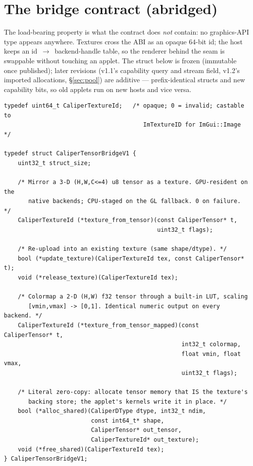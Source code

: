 \documentclass[11pt]{article}
\begin{document}
\appendix
\section{The bridge contract (abridged)}

The load-bearing property is what the contract does \emph{not} contain: no
graphics-API type appears anywhere. Textures cross the ABI as an opaque
64-bit id; the host keeps an id~$\rightarrow$~backend-handle table, so the
renderer behind the seam is swappable without touching an applet. The struct
below is frozen (immutable once published); later revisions (v1.1's
capability query and stream field, v1.2's imported allocations,
\S\ref{sec:pool}) are additive --- prefix-identical structs and new
capability bits, so old applets run on new hosts and vice versa.

\begin{lstlisting}
typedef uint64_t CaliperTextureId;   /* opaque; 0 = invalid; castable to
                                        ImTextureID for ImGui::Image */

typedef struct CaliperTensorBridgeV1 {
    uint32_t struct_size;

    /* Mirror a 3-D (H,W,C<=4) u8 tensor as a texture. GPU-resident on the
       native backends; CPU-staged on the GL fallback. 0 on failure. */
    CaliperTextureId (*texture_from_tensor)(const CaliperTensor* t,
                                            uint32_t flags);

    /* Re-upload into an existing texture (same shape/dtype). */
    bool (*update_texture)(CaliperTextureId tex, const CaliperTensor* t);
    void (*release_texture)(CaliperTextureId tex);

    /* Colormap a 2-D (H,W) f32 tensor through a built-in LUT, scaling
       [vmin,vmax] -> [0,1]. Identical numeric output on every backend. */
    CaliperTextureId (*texture_from_tensor_mapped)(const CaliperTensor* t,
                                                   int32_t colormap,
                                                   float vmin, float vmax,
                                                   uint32_t flags);

    /* Literal zero-copy: allocate tensor memory that IS the texture's
       backing store; the applet's kernels write it in place. */
    bool (*alloc_shared)(CaliperDType dtype, int32_t ndim,
                         const int64_t* shape,
                         CaliperTensor* out_tensor,
                         CaliperTextureId* out_texture);
    void (*free_shared)(CaliperTextureId tex);
} CaliperTensorBridgeV1;
\end{lstlisting}
\end{document}
